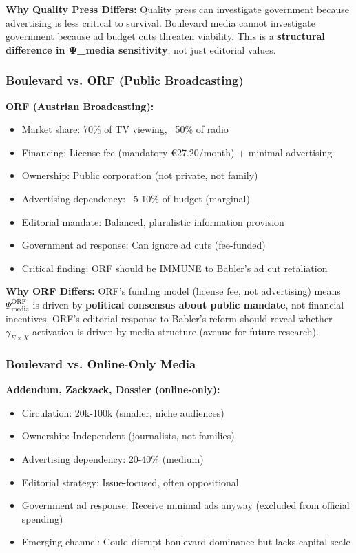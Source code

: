 \textbf{Why Quality Press Differs:}
Quality press can investigate government because advertising is less critical to survival.
Boulevard media cannot investigate government because ad budget cuts threaten viability.
This is a \textbf{structural difference in Ψ_media sensitivity}, not just editorial values.

\subsubsection*{Boulevard vs. ORF (Public Broadcasting)}

\textbf{ORF (Austrian Broadcasting):}
\begin{itemize}
\item Market share: 70\% of TV viewing, ~50\% of radio
\item Financing: License fee (mandatory €27.20/month) + minimal advertising
\item Ownership: Public corporation (not private, not family)
\item Advertising dependency: ~5-10\% of budget (marginal)
\item Editorial mandate: Balanced, pluralistic information provision
\item Government ad response: Can ignore ad cuts (fee-funded)
\item Critical finding: ORF should be IMMUNE to Babler's ad cut retaliation
\end{itemize}

\textbf{Why ORF Differs:}
ORF's funding model (license fee, not advertising) means $\Psi_{\text{media}}^{\text{ORF}}$ is driven by
\textbf{political consensus about public mandate}, not financial incentives. ORF's editorial response
to Babler's reform should reveal whether $\gamma_{E \times X}$ activation is driven by media structure
(avenue for future research).

\subsubsection*{Boulevard vs. Online-Only Media}

\textbf{Addendum, Zackzack, Dossier (online-only):}
\begin{itemize}
\item Circulation: 20k-100k (smaller, niche audiences)
\item Ownership: Independent (journalists, not families)
\item Advertising dependency: 20-40\% (medium)
\item Editorial strategy: Issue-focused, often oppositional
\item Government ad response: Receive minimal ads anyway (excluded from official spending)
\item Emerging channel: Could disrupt boulevard dominance but lacks capital scale
\end{itemize}

